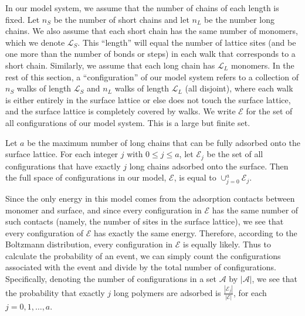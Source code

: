 \documentclass[journal=mamobx,manuscript=article]{achemso}
\newcommand{\leng}{\mathcal{L}}
\begin{document}
In our model system, we assume that the number of chains of each length is fixed.  
Let $n_S$ be the number of short chains
and let $n_L$ be the number long chains.
We also assume that each
short chain has the same number of monomers, 
which we denote $\leng_S$.  This ``length'' 
will equal the number of lattice sites (and be one
more than the number of bonds or steps) in each
walk that corresponds to a short chain.
Similarly, we assume that each long 
chain has $\leng_L$ monomers.
In the rest of this section, a ``configuration''
of our model system refers to a collection of $n_S$
walks of length $\leng_S$ and $n_L$ walks of length
$\leng_L$ (all disjoint), 
where each walk is either entirely in the 
surface lattice or else does not touch the surface
lattice, and the surface lattice is completely 
covered by walks.  
We write $\mathcal{E}$ for the 
set of all configurations of our model system.
This is a large but finite set.

Let $a$ be the maximum number of long chains that
can be fully adsorbed onto the surface lattice.
For each integer $j$ with $0\leq j\leq a$, let
$\mathcal{E}_j$ be the set of all configurations that have exactly $j$ long chains adsorbed 
onto the surface.  
Then the full space of configurations in our model,
$\mathcal{E}$, is equal to 
$\cup_{j=0}^a {\mathcal{E}_j}$. 

Since the only energy in this model comes from the adsorption contacts between monomer and surface,
and since every configuration in $\mathcal{E}$ has the same number of such contacts
(namely, the number of sites in the surface lattice),
we see that every configuration of $\mathcal{E}$ has exactly the same energy.
Therefore, according to the Boltzmann distribution, every configuration in $\mathcal{E}$ is equally
likely. Thus to calculate the probability of an event, we can simply count the configurations associated with the event and divide by the total number of configurations.
Specifically, denoting the number of configurations in a set $\mathcal{A}$ by $|\mathcal{A}|$, we see that
the probability that exactly $j$ long polymers are adsorbed is $\frac{|\mathcal{E}_j|}{|\mathcal{E}|}$,
for each $j=0,1,\ldots,a$.
\end{document}
